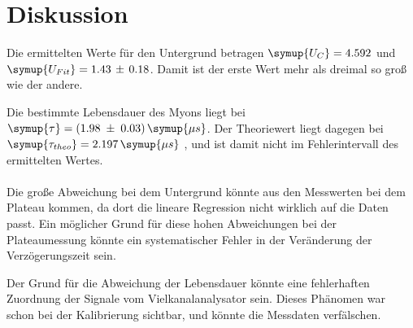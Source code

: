 \section{Diskussion}
\label{sec:Diskussion}

Die ermittelten Werte für den Untergrund betragen $\symup{U_{C}} = 4.592$ und
$\symup{U_{Fit}} = 1.43\,\pm\,0.18$. Damit ist der erste Wert mehr als dreimal so
groß wie der andere.

Die bestimmte Lebensdauer des Myons liegt bei $\symup{\tau} = (1.98\;\pm\;0.03)\,\symup{\mu s}$.
Der Theoriewert liegt dagegen bei $\symup{\tau_{theo}} = 2.197\,\symup{\mu s}$ \cite{pdg}, und ist
damit nicht im Fehlerintervall des ermittelten Wertes.\\
\ \\
\noindent
Die große Abweichung bei dem Untergrund könnte aus den Messwerten bei dem Plateau kommen, da
dort die lineare Regression nicht wirklich auf die Daten passt. Ein möglicher Grund für diese
hohen Abweichungen bei der Plateaumessung könnte ein systematischer Fehler in der Veränderung
der Verzögerungszeit sein.

Der Grund für die Abweichung der Lebensdauer könnte eine fehlerhaften Zuordnung der Signale
vom Vielkanalanalysator sein. Dieses Phänomen war schon bei der Kalibrierung sichtbar,
und könnte die Messdaten verfälschen.
